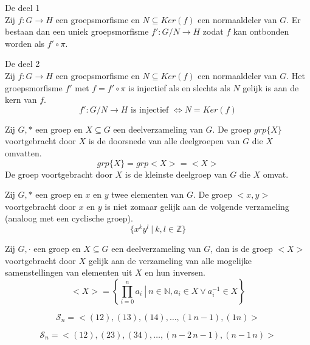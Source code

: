 \documentclass[main.tex]{subfiles}
\begin{document}
\begin{st}
De  deel 1\\
Zij $f: G\rightarrow H$ een groepsmorfisme en $N\subseteq Ker(f)$ een normaaldeler van $G$.
Er bestaan dan een uniek groepsmorfisme $f':G/N \rightarrow H$ zodat $f$ kan ontbonden worden als $f'\circ \pi$.
\end{st}

\begin{st}
De  deel 2\\
Zij $f: G\rightarrow H$ een groepsmorfisme en $N\subseteq Ker(f)$ een normaaldeler van $G$.
Het groepsmorfisme $f'$ met $f = f'\circ \pi$ is injectief als en slechts als $N$ gelijk is aan de kern van $f$.
\[ f':G/N \rightarrow H \text{ is injectief } \Leftrightarrow N = Ker(f) \]
\end{st}

\begin{de}
Zij $G,*$ een groep en $X \subseteq G$ een deelverzameling van $G$.
De groep $grp\{X\}$ voortgebracht door $X$ is de doorsnede van alle deelgroepen van $G$ die $X$ omvatten. 
\[ grp\{X\} = grp<X> = <X> \]
De groep voortgebracht door $X$ is de kleinste deelgroep van $G$ die $X$ omvat.
\end{de}

\begin{opm}
Zij $G,*$ een groep en $x$ en $y$ twee elementen van $G$.
De groep $<x,y>$ voortgebracht door $x$ en $y$ is niet zomaar gelijk aan de volgende verzameling (analoog met een cyclische groep).
\[ \{ x^{k}y^{l}\ |\ k,l\in \mathbb{Z} \} \]
\end{opm}

\begin{ei}
Zij $G,\cdot$ een groep en $X \subseteq G$ een deelverzameling van $G$, dan is de groep $<X>$ voortgebracht door $X$ gelijk aan de verzameling van alle mogelijke samenstellingen van elementen uit $X$ en hun inversen.
\[ <X> = \left\{ \prod_{i=0}^{n}a_{i} \ \left|\ n\in \mathbb{N}, a_{i}\in X \vee a_{i}^{-1} \in X \right.\right\}\]
\end{ei}

\begin{pr}
\[ \mathcal{S}_n = <(12),(13),(14),\dotsc, (1\, n-1), (1n)> \]
\end{pr}

\begin{pr}
\[ \mathcal{S}_n = <(12),(23),(34),\dotsc, (n-2\, n-1), (n-1\,n)> \]
\end{pr}
\end{document}
